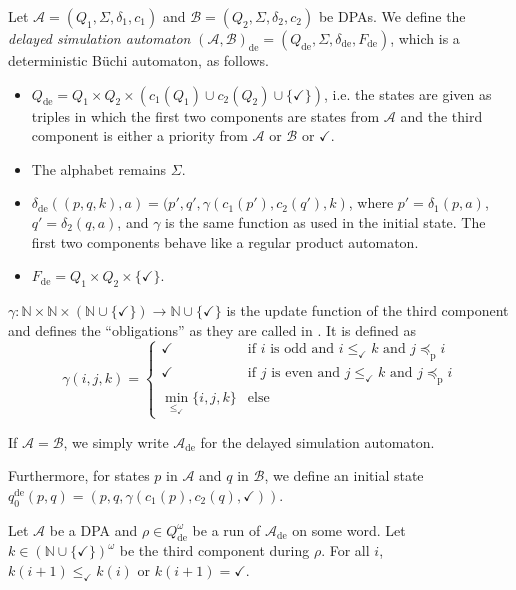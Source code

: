 \begin{defn}
	Let $\mathcal{A} = (Q_1, \Sigma, \delta_1, c_1)$ and $\mathcal{B} = (Q_2, \Sigma, \delta_2, c_2)$ be DPAs. We define the \emph{delayed simulation automaton} $(\mathcal{A},\mathcal{B})_\text{de} = (Q_\text{de}, \Sigma, \delta_\text{de}, F_\text{de})$, which is a deterministic Büchi automaton, as follows.
	
	\begin{itemize}
		\item $Q_\text{de} = Q_1 \times Q_2 \times (c_1(Q_1) \cup c_2(Q_2) \cup \{ \checkmark \})$, i.e. the states are given as triples in which the first two components are states from $\mathcal{A}$ and the third component is either a priority from $\mathcal{A}$ or $\mathcal{B}$ or $\checkmark$.
		\item The alphabet remains $\Sigma$.
		\item $\delta_\text{de}( (p, q, k), a ) = ( p', q', \gamma(c_1(p'), c_2(q'), k)$, where $p' = \delta_1(p, a)$, $q' = \delta_2(q, a)$, and $\gamma$ is the same function as used in the initial state. The first two components behave like a regular product automaton.
		\item $F_\text{de} = Q_1 \times Q_2 \times \{ \checkmark \}$.
	\end{itemize}
	
	$\gamma : \mathbb{N} \times \mathbb{N} \times (\mathbb{N} \cup \{\checkmark\}) \rightarrow \mathbb{N} \cup \{\checkmark\}$ is the update function of the third component and defines the \enquote{obligations} as they are called in \cite{FritzWilke06}. It is defined as 
	$$ \gamma(i, j, k) = \begin{cases}
		\checkmark & \text{if } i \text{ is odd and } i \leq_\checkmark k \text{ and } j \preceq_\text{p} i \\
		\checkmark & \text{if } j \text{ is even and } j \leq_\checkmark k \text{ and } j \preceq_\text{p} i \\
		\min_{\leq_\checkmark} \{ i,j,k \} & \text{else}
	\end{cases} $$
	
	If $\mathcal{A} = \mathcal{B}$, we simply write $\mathcal{A}_\text{de}$ for the delayed simulation automaton.
	
	Furthermore, for states $p$ in $\mathcal{A}$ and $q$ in $\mathcal{B}$, we define an initial state $q_0^\text{de}(p, q) = (p, q, \gamma(c_1(p), c_2(q), \checkmark))$.
\end{defn}

\begin{lem}
\label{lem:fritzwilke:k_shrink}
	Let $\mathcal{A}$ be a DPA and $\rho \in Q_\text{de}^\omega$ be a run of $\mathcal{A}_\text{de}$ on some word. Let $k \in (\mathbb{N} \cup \{\checkmark\})^\omega$ be the third component during $\rho$. For all $i$, $k(i+1) \leq_\checkmark k(i)$ or $k(i+1) = \checkmark$.
\end{lem}

